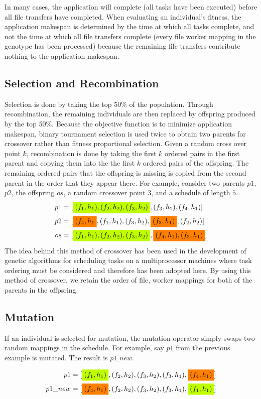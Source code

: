 In many cases, the application will complete (all tasks have been executed) before
all file transfers have completed. When evaluating an individual's fitness, the
application makespan is determined by the time at which all tasks complete, and
not the time at which all file transfers complete (every file worker mapping in the
genotype has been processed) because the remaining file transfers contribute
nothing to the application makespan.

\subsection*{Selection and Recombination}
Selection is done by taking the top 50\% of the population. Through
recombination, the remaining individuals are then replaced by offspring produced
by the top 50\%. Because the objective function is to minimize application
makespan, binary tournament selection is used twice to obtain two parents for
crossover rather than fitness proportional selection. Given a random cross over
point $k$, recombination is done by taking the first $k$ ordered pairs in the
first parent and copying them into the the first $k$ ordered pairs of the
offspring. The remaining ordered pairs that the offspring is missing is copied
from the second parent in the order that they appear there. For example,
consider two parents $p1$, $p2$, the offspring $os$, a random crossover point
$3$, and a schedule of length $5$.
\begin{align}
 p1 & = [\mathcolorbox{lime}{(f_1, h_1), (f_2, h_2), (f_3, h_2)}, (f_3, h_1), (f_4, h_1)] \nonumber \\
 p2 & = [\mathcolorbox{orange}{(f_4, h_1}, (f_1, h_1),(f_3, h_2), \mathcolorbox{orange}{(f_3, h_1)}, (f_2, h_2)] \nonumber \\
 os & = [\mathcolorbox{lime}{(f_1, h_1), (f_2, h_2), (f_3, h_2)}, \mathcolorbox{orange}{(f_4, h_1), (f_3, h_1)}] \nonumber
\end{align}
The idea behind this method of crossover has been used in the development of
genetic algorithms for scheduling tasks on a multiprocessor machines \cite{wu-incremental-genetic-04}
where task ordering must be considered and therefore has been adopted here.
By using this method of crossover, we retain the order of file, worker
mappings for both of the parents in the offpsring.

\subsection*{Mutation}
If an individual is selected for mutation, the mutation operator simply swaps
two random mappings in the schedule. For example, say $p1$ from
the previous example is mutated. The result is $p1\_new$.

\begin{align}
 p1 & = [\mathcolorbox{lime}{(f_1, h_1)}, (f_2, h_2), (f_3, h_2), (f_3, h_1), \mathcolorbox{orange}{(f_4, h_1)}] \nonumber \\
 p1\_new & = [\mathcolorbox{orange}{(f_4, h_1)}, (f_2, h_2), (f_3, h_2), (f_3, h_1),\mathcolorbox{lime}{(f_1, h_1)}] \nonumber
\end{align}
